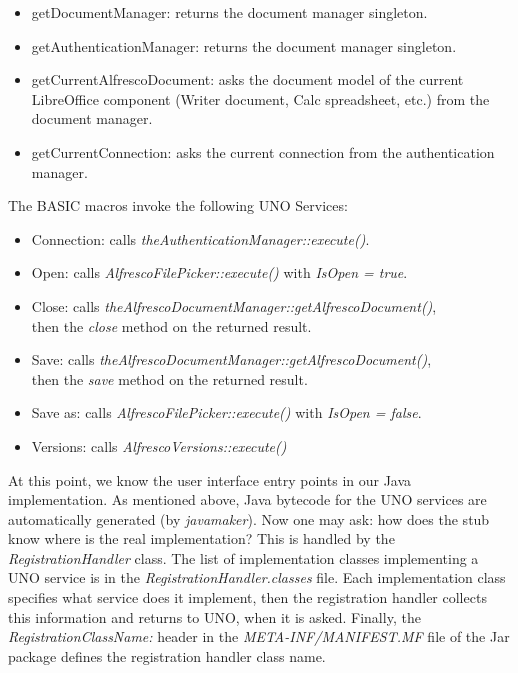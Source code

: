 \begin{itemize}
\item getDocumentManager: returns the document manager singleton.
\item getAuthenticationManager: returns the document manager singleton.
\item getCurrentAlfrescoDocument: asks the document model of the current LibreOffice component (Writer document, Calc spreadsheet, etc.) from the document manager.
\item getCurrentConnection: asks the current connection from the authentication manager.
\end{itemize}

The BASIC macros invoke the following UNO Services:

\begin{itemize}
\item Connection: calls \emph{theAuthenticationManager::execute()}.
\item Open: calls \emph{AlfrescoFilePicker::execute()} with \emph{IsOpen = true}.
\item Close: calls \emph{theAlfrescoDocumentManager::getAlfrescoDocument()}, \\ then the \emph{close} method on the returned result.
\item Save: calls \emph{theAlfrescoDocumentManager::getAlfrescoDocument()}, \\ then the \emph{save} method on the returned result.
\item Save as: calls \emph{AlfrescoFilePicker::execute()} with \emph{IsOpen = false}.
\item Versions: calls \emph{AlfrescoVersions::execute()}
\end{itemize}

At this point, we know the user interface entry points in our Java
implementation. As mentioned above, Java bytecode for the UNO services are
automatically generated (by \emph{javamaker}). Now one may ask: how does the
stub know where is the real implementation? This is handled by the
\emph{RegistrationHandler} class. The list of implementation classes
implementing a UNO service is in the \emph{RegistrationHandler.classes} file.
Each implementation class specifies what service does it implement, then the
registration handler collects this information and returns to UNO, when it is
asked. Finally, the \emph{RegistrationClassName:} header in the
\emph{META-INF/MANIFEST.MF} file of the Jar package defines the registration
handler class name.

